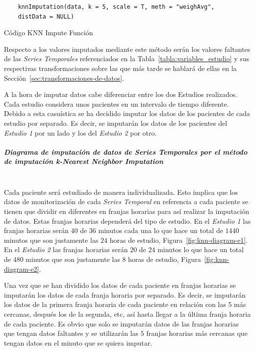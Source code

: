 \begin{code}[H]
\begin{lstlisting}
    knnImputation(data, k = 5, scale = T, meth = "weighAvg",
    distData = NULL)
\end{lstlisting}
\caption{Código KNN Impute Función}
\label{cod:snipet-knn-impute}
\end{code}

Respecto a los valores imputados mediante este método serán los valores faltantes de las \textit{Series Temporales} referenciados en la Tabla~\ref{tabla:variables_estudio} y sus respectivas transformaciones sobre las que más tarde se hablará de ellas en la Sección~\ref{sec:transformaciones-de-datos}. 

A la hora de imputar datos cabe diferenciar entre los dos Estudios realizados. Cada estudio considera unos pacientes en un intervalo de tiempo diferente. Debido a esta casuística se ha decidido imputar los datos de los pacientes de cada estudio por separado. Es decir, se imputarán los datos de los pacientes del \textit{Estudio 1} por un lado y los del \textit{Estudio 2} por otro.

\subparagraph*{Diagrama de imputación de datos de \textit{Series Temporales} por el método de imputación \textit{k-Nearest Neighbor Imputation}}\label{sec:diagrama-imputacion-knn} \\

Cada paciente será estudiado de manera individualizada. Esto implica que los datos de monitorización de cada \textit{Series Temporal} en referencia a cada paciente se tienen que dividir en diferentes en franjas horarias para así realizar la imputación de datos. Estas franjas horarias dependerá del tipo de estudio. En el \textit{Estudio 1} las franjas horarias serán $40$ de $36$ minutos cada una lo que hace un total de $1440$ minutos que son justamente las $24$ horas de estudio, Figura~\ref{fig:knn-diagram-e1}. En el \textit{Estudio 2} las franjas horarias serán $20$ de $24$ minutos lo que hace un total de $480$ minutos que son justamente las $8$ horas de estudio, Figura~\ref{fig:knn-diagram-e2}.

Una vez que se han dividido los datos de cada paciente en franjas horarias se imputarán los datos de cada franja horaria por separado. Es decir, se imputarán los datos de la primera franja horaria de cada paciente en relación con las 5 más cercanas, después los de la segunda, etc, así hasta llegar a la última franja horaria de cada paciente. Es obvio que solo se imputarán datos de las franjas horarias que tengan datos faltantes y se utilizarán las $5$ franjas horarias más cercanas que tengan datos en el minuto que se quiera imputar.


